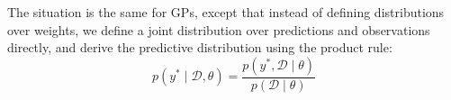 The situation is the same for GPs, except that instead of defining distributions over weights, we define a joint distribution over predictions and observations directly, and derive the predictive distribution using the product rule:
\begin{equation}
    p(y^* \mid \mathcal{D}, \theta ) = \frac{p(y^*, \mathcal{D} \mid \theta )}{p(\mathcal{D} \mid \theta )}
\end{equation}

